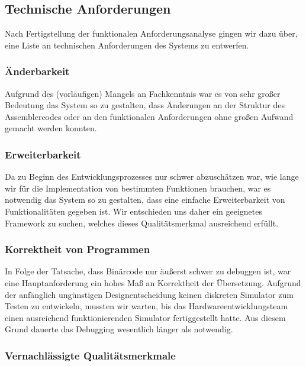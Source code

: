 \documentclass[paper=a4,fontsize=11pt,twocolumn]{scrreprt}
\begin{document}
\subsection{Technische Anforderungen}
\label{subsec:technische_anforderungen}

Nach Fertigstellung der funktionalen Anforderungsanalyse gingen wir dazu über, eine Liste an technischen Anforderungen des Systems zu entwerfen.

\subsubsection{Änderbarkeit}

Aufgrund des (vorläufigen) Mangels an Fachkenntnis war es von sehr großer Bedeutung das System so zu gestalten, dass Änderungen an der Struktur des Assemblercodes oder an den funktionalen Anforderungen ohne großen Aufwand gemacht werden konnten.

\subsubsection{Erweiterbarkeit}

Da zu Beginn des Entwicklungsprozesses nur schwer abzuschätzen war, wie lange wir für die Implementation von bestimmten Funktionen brauchen, war es notwendig das System so zu gestalten, dass eine einfache Erweiterbarkeit von Funktionalitäten gegeben ist.
Wir entschieden uns daher ein geeignetes Framework zu suchen, welches dieses Qualitätsmerkmal ausreichend erfüllt. 

\subsubsection{Korrektheit von Programmen}

In Folge der Tatsache, dass Binärcode nur äußerst schwer zu debuggen ist, war eine Hauptanforderung ein hohes Maß an Korrektheit der Übersetzung.
Aufgrund der anfänglich ungünstigen Designentscheidung keinen diskreten Simulator zum Testen zu entwickeln, mussten wir warten, bis das Hardwareentwicklungsteam einen ausreichend funktionierenden Simulator fertiggestellt hatte.
Aus diesem Grund dauerte das Debugging wesentlich länger als notwendig.

\subsubsection{Vernachlässigte Qualitätsmerkmale}
\end{document}
